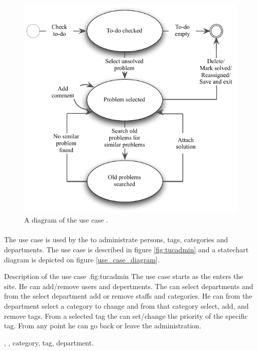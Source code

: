 \begin{figure}[htb]
\begin{center}
 \includegraphics[scale=0.8]{input/application_domain_analysis/solve_problem_use_case}
\caption{A diagram of the use case \ucsolproblem{}.}
\label{fig:solve_problem_use_case}
\end{center}
\end{figure}

\paragraph{\tucadmin[c]} The use case \tucadmin[] is used by the \sadmin[] to administrate persons, tags, categories and departments. The use case is described in figure \ref{fig:tucadmin} and a statechart diagram is depicted on figure \ref{use_case_diagram}.


\begin{sadlist}[h]{\tucadmin[c]}{Description of the use case \tucadmin{}.}{fig:tucadmin}
 The use case starts as the \sadmin{} enters the site. He can add/remove users and depertments. The \sadmin{} can select departments and from the select department add or remove staffs and categories. He can from the department select a category to change and from that category select, add, and remove tags. From a selected tag the \sadmin{} can set/change the priority of the specific tag. From any point he can go back or leave the administration. 

 \staff[c], \client[c], category, tag, department. 


\end{sadlist}


